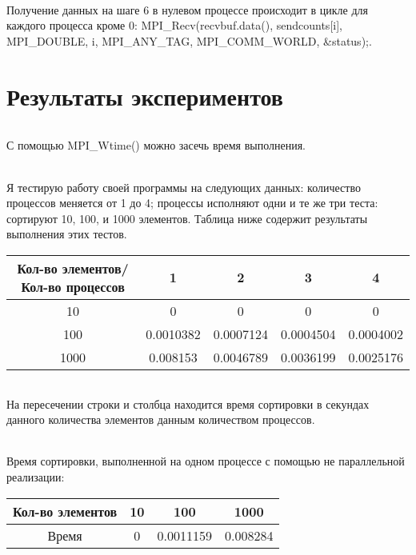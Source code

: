 \documentclass[12pt,a4paper]{article}
\begin{document}
\paragraph{}Получение данных на шаге 6 в нулевом процессе происходит в цикле для каждого процесса кроме 0: MPI\_Recv(recvbuf.data(), sendcounts[i], MPI\_DOUBLE, i, MPI\_ANY\_TAG, MPI\_COMM\_WORLD, &status);.

\part*{Результаты экспериментов}
\paragraph{}С помощью MPI\_Wtime() можно засечь время выполнения.
\paragraph{}Я тестирую работу своей программы на следующих данных: количество процессов меняется от 1 до 4; процессы исполняют одни и те же три теста: сортируют 10, 100, и 1000 элементов. Таблица ниже содержит результаты выполнения этих тестов.
\begin{center}
\begin{tabular}{||c c c c c ||} 
 \hline
 Кол-во элементов/Кол-во процессов & 1 & 2 & 3 & 4 \\ [0.5ex] 
 \hline\hline
 10 & 0 & 0 & 0 & 0\\ 
 \hline
 100 & 0.0010382 & 0.0007124 & 0.0004504 & 0.0004002 \\
 \hline
 1000 & 0.008153 & 0.0046789 & 0.0036199 & 0.0025176 \\
[1ex] 
 \hline
\end{tabular}
\end{center}
\paragraph{}На пересечении строки и столбца находится время сортировки в секундах данного количества элементов данным количеством процессов.
\paragraph{}Время сортировки, выполненной на одном процессе с помощью не параллельной реализации:
\begin{center}
\begin{tabular}{||c c c c||} 
 \hline
 Кол-во элементов & 10 & 100 & 1000 \\ [0.5ex] 
 \hline\hline
 Время & 0 & 0.0011159 & 0.008284\\ 
[1ex] 
 \hline
\end{tabular}
\end{center}
\end{document}
